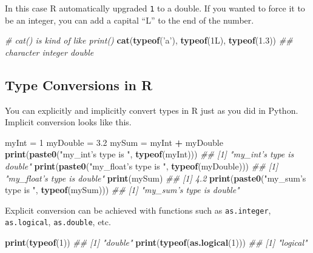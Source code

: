 \documentclass[12pt,krantz2]{krantz}
\makeatletter
\newenvironment{Shaded}{\begin{snugshade}}{\end{snugshade}}
\newcommand{\CommentTok}[1]{\textcolor[rgb]{0.37,0.37,0.37}{\textit{#1}}}
\newcommand{\DecValTok}[1]{\textcolor[rgb]{0.06,0.06,0.06}{#1}}
\newcommand{\FloatTok}[1]{\textcolor[rgb]{0.06,0.06,0.06}{#1}}
\newcommand{\KeywordTok}[1]{\textcolor[rgb]{0.27,0.27,0.27}{\textbf{#1}}}
\newcommand{\NormalTok}[1]{#1}
\newcommand{\OperatorTok}[1]{\textcolor[rgb]{0.43,0.43,0.43}{\textbf{#1}}}
\newcommand{\StringTok}[1]{\textcolor[rgb]{0.5,0.5,0.5}{#1}}
\newenvironment{kframe}{%
\medskip{}
\setlength{\fboxsep}{.8em}
 \def\at@end@of@kframe{}%
 \ifinner\ifhmode%
  \def\at@end@of@kframe{\end{minipage}}%
  \begin{minipage}{\columnwidth}%
 \fi\fi%
 \def\FrameCommand##1{\hskip\@totalleftmargin \hskip-\fboxsep
 \colorbox{shadecolor}{##1}\hskip-\fboxsep
     \hskip-\linewidth \hskip-\@totalleftmargin \hskip\columnwidth}%
 \MakeFramed {\advance\hsize-\width
   \@totalleftmargin\z@ \linewidth\hsize
   \@setminipage}}%
 {\par\unskip\endMakeFramed%
 \at@end@of@kframe}
\renewenvironment{Shaded}{\begin{kframe}}{\end{kframe}}
\makeatother
\begin{document}
In this case R automatically upgraded \texttt{1} to a double. If you wanted to force it to be an integer, you can add a capital ``L'' to the end of the number.

\begin{Shaded}
\begin{Highlighting}[]
\CommentTok{# cat() is kind of like print()}
\KeywordTok{cat}\NormalTok{(}\KeywordTok{typeof}\NormalTok{(}\StringTok{'a'}\NormalTok{), }\KeywordTok{typeof}\NormalTok{(1L), }\KeywordTok{typeof}\NormalTok{(}\FloatTok{1.3}\NormalTok{))}
\CommentTok{## character integer double}
\end{Highlighting}
\end{Shaded}

\hypertarget{type-conversions-in-r}{%
\subsection{Type Conversions in R}\label{type-conversions-in-r}}

You can explicitly and implicitly convert types in R just as you did in Python. Implicit conversion looks like this.

\begin{Shaded}
\begin{Highlighting}[]
\NormalTok{myInt =}\StringTok{ }\DecValTok{1}
\NormalTok{myDouble =}\StringTok{ }\FloatTok{3.2}
\NormalTok{mySum =}\StringTok{ }\NormalTok{myInt }\OperatorTok{+}\StringTok{ }\NormalTok{myDouble}
\KeywordTok{print}\NormalTok{(}\KeywordTok{paste0}\NormalTok{(}\StringTok{"my_int's type is "}\NormalTok{, }\KeywordTok{typeof}\NormalTok{(myInt)))}
\CommentTok{## [1] "my_int's type is double"}
\KeywordTok{print}\NormalTok{(}\KeywordTok{paste0}\NormalTok{(}\StringTok{"my_float's type is "}\NormalTok{, }\KeywordTok{typeof}\NormalTok{(myDouble)))}
\CommentTok{## [1] "my_float's type is double"}
\KeywordTok{print}\NormalTok{(mySum)}
\CommentTok{## [1] 4.2}
\KeywordTok{print}\NormalTok{(}\KeywordTok{paste0}\NormalTok{(}\StringTok{"my_sum's type is "}\NormalTok{, }\KeywordTok{typeof}\NormalTok{(mySum)))}
\CommentTok{## [1] "my_sum's type is double"}
\end{Highlighting}
\end{Shaded}

Explicit conversion can be achieved with functions such as \texttt{as.integer}, \texttt{as.logical}, \texttt{as.double}, etc.

\begin{Shaded}
\begin{Highlighting}[]
\KeywordTok{print}\NormalTok{(}\KeywordTok{typeof}\NormalTok{(}\DecValTok{1}\NormalTok{))}
\CommentTok{## [1] "double"}
\KeywordTok{print}\NormalTok{(}\KeywordTok{typeof}\NormalTok{(}\KeywordTok{as.logical}\NormalTok{(}\DecValTok{1}\NormalTok{)))}
\CommentTok{## [1] "logical"}
\end{Highlighting}
\end{Shaded}
\end{document}
